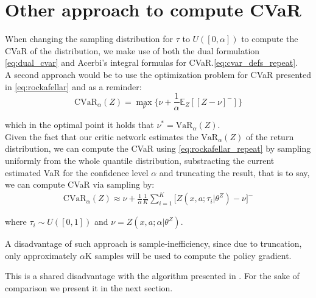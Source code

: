 \section{Other approach to compute CVaR}

When changing the sampling distribution for $\tau$ to $U([0,\alpha])$
to compute the CVaR of the
distribution, we make use of both the dual formulation \ref{eq:dual_cvar} and Acerbi's
integral formulas for CVaR.\ref{eq:cvar_defs_repeat}.\\
A second approach would be to use the \citet{Rockafellar2000} optimization problem
for CVaR presented in \ref{eq:rockafellar} and as a reminder:
\begin{equation}
    \text{CVaR}_\alpha (Z) = \underset{\nu} \max \big\{\nu + \frac{1}{\alpha} \mathbb E_Z[[Z- \nu]^-]\big\} \label{eq:rockafellar_repeat}
\end{equation}

which in the optimal point it holds that $\nu^*=\text{VaR}_\alpha(Z)$.\\
Given the fact that our critic network estimates the $\text{VaR}_\alpha(Z)$ of the
return distribution, we can compute the CVaR using \ref{eq:rockafellar_repeat}
by sampling uniformly from  the whole quantile distribution, substracting the current
estimated VaR for the confidence level  $\alpha$ and truncating the result, that is to say,
we can compute CVaR via sampling by:
\begin{align}
    \text{CVaR}_\alpha(Z) \approx \nu + \frac{1}{\alpha} \frac{1}{K}
\sum_{i=1}^K \big[ Z(x,a; \tau_i\vert \theta^Z) - \nu \big]^- 
\end{align}

where $\tau_i \sim U([0,1])$ and $\nu = Z(x,a; \alpha \vert \theta^Z)$.

A disadvantage of such approach is sample-inefficiency, since due to truncation, 
only approximately $\alpha$K samples will be used to compute the policy gradient.

This is a shared disadvantage with the algorithm presented in
\citet{Chow2014}. For the sake of comparison we present it in the next section.
